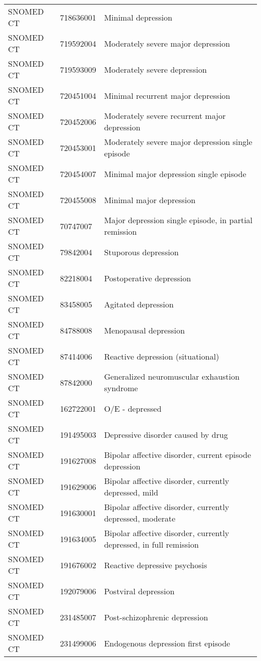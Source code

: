 \begin{longtable}{p{}p{}p{}}
  SNOMED CT & 718636001 & Minimal depression \\ 
  SNOMED CT & 719592004 & Moderately severe major depression \\ 
  SNOMED CT & 719593009 & Moderately severe depression \\ 
  SNOMED CT & 720451004 & Minimal recurrent major depression \\ 
  SNOMED CT & 720452006 & Moderately severe recurrent major depression \\ 
  SNOMED CT & 720453001 & Moderately severe major depression single episode \\ 
  SNOMED CT & 720454007 & Minimal major depression single episode \\ 
  SNOMED CT & 720455008 & Minimal major depression \\ 
  SNOMED CT & 70747007 & Major depression single episode, in partial remission \\ 
  SNOMED CT & 79842004 & Stuporous depression \\ 
  SNOMED CT & 82218004 & Postoperative depression \\ 
  SNOMED CT & 83458005 & Agitated depression \\ 
  SNOMED CT & 84788008 & Menopausal depression \\ 
  SNOMED CT & 87414006 & Reactive depression (situational) \\ 
  SNOMED CT & 87842000 & Generalized neuromuscular exhaustion syndrome \\ 
  SNOMED CT & 162722001 & O/E - depressed \\ 
  SNOMED CT & 191495003 & Depressive disorder caused by drug \\ 
  SNOMED CT & 191627008 & Bipolar affective disorder, current episode depression \\ 
  SNOMED CT & 191629006 & Bipolar affective disorder, currently depressed, mild \\ 
  SNOMED CT & 191630001 & Bipolar affective disorder, currently depressed, moderate \\ 
  SNOMED CT & 191634005 & Bipolar affective disorder, currently depressed, in full remission \\ 
  SNOMED CT & 191676002 & Reactive depressive psychosis \\ 
  SNOMED CT & 192079006 & Postviral depression \\ 
  SNOMED CT & 231485007 & Post-schizophrenic depression \\ 
  SNOMED CT & 231499006 & Endogenous depression first episode \\ 

\end{longtable}
